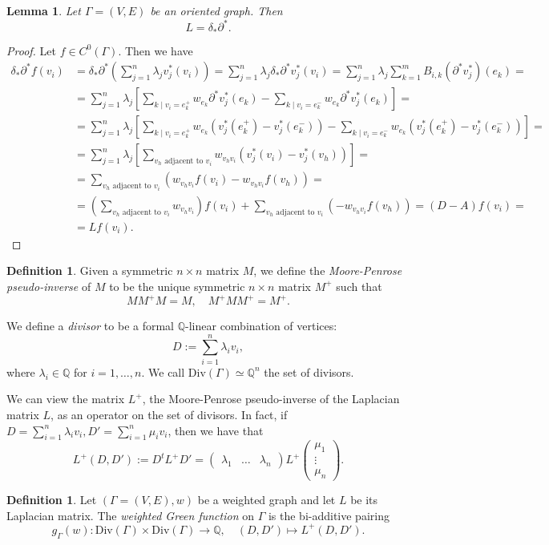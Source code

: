 \documentclass[a4paper,12 pt,titlepage,twoside]{book}
\newcommand{\numberset}{\mathbb}
\newcommand{\Q}{\numberset{Q}}
\theoremstyle{plain}
\theoremstyle{theorem}
\newtheorem{lemma}[thm]{Lemma}
\theoremstyle{definition}
\newtheorem{defn}[thm]{Definition}
\theoremstyle{remark}
\begin{document}
	\begin{lemma}
		Let $\Gamma=(V,E)$ be an oriented graph. Then $$L = \delta_* \partial^*.$$
	\end{lemma}
	\begin{proof}
		Let $f \in C^0(\Gamma).$ Then we have
		$$\begin{aligned}
		\delta_* \partial^* f(v_i) &= \delta_* \partial^*\left(\sum_{j=1}^n \lambda_j v_j^*(v_i)\right) = \sum_{j=1}^n \lambda_j \delta_* \partial^* v_j^* (v_i) = \sum_{j=1}^n \lambda_j \sum_{k=1}^m B_{i,k} (\partial^* v_j^*)(e_k)=\\&= \sum_{j=1}^n \lambda_j \left[\sum_{k \mid v_i=e_k^+} w_{e_k}\partial^* v_j^*(e_k) - \sum_{k \mid v_i=e_k^-} w_{e_k}\partial^* v_j^*(e_k) \right] =\\&= \sum_{j=1}^n \lambda_j \left[\sum_{k \mid v_i=e_k^+} w_{e_k}\left(v_j^* (e_k^+) - v_j^*(e_k^-)\right) - \sum_{k \mid v_i=e_k^-} w_{e_k}\left(v_j^*(e_k^+) - v_j^*(e_k^-)\right)\right] =\\&= \sum_{j=1}^n \lambda_j \left[\sum_{v_h \text{ adjacent to } v_i} w_{v_hv_i}(v_j^*(v_i) - v_j^*(v_h))\right] =\\&= \sum_{v_h \text{ adjacent to } v_i} \left(w_{v_hv_i}f(v_i) - w_{v_hv_i}f(v_h)\right) =\\&= \left(\sum_{v_h \text{ adjacent to } v_i} w_{v_hv_i}\right) f(v_i) + \sum_{v_h \text{ adjacent to } v_i} \left(-w_{v_hv_i}f(v_h)\right) = (D-A)f(v_i) =\\&= L f(v_i).
		\end{aligned}$$
	\end{proof}
	\begin{defn}
		Given a symmetric $n \times n$ matrix $M$, we define the \emph{Moore-Penrose pseudo-inverse} of $M$ to be the unique symmetric $n \times n$ matrix $M^+$ such that $$M M^+ M = M, \quad M^+ M M^+ = M^+.$$
	\end{defn}
	We define a \emph{divisor} to be a formal $\Q$-linear combination of vertices: $$D := \sum_{i=1}^n \lambda_i v_i,$$ where $\lambda_i \in \Q$ for $i = 1, \dots, n.$ We call $\text{Div}(\Gamma) \simeq \Q^n$ the set of divisors.
	
	We can view the matrix $L^+$, the Moore-Penrose pseudo-inverse of the Laplacian matrix $L$, as an operator on the set of divisors. In fact, if $D = \sum_{i=1}^n \lambda_i v_i, D'= \sum_{i=1}^n \mu_i v_i$, then we have that $$L^+(D, D') := D^tL^+ D' =\left(\begin{array}{ccc} \lambda_1 & \dots & \lambda_n \end{array}\right) L^+ \left(\begin{array}{c} \mu_1\\ \vdots \\ \mu_n \end{array}\right).$$
	\begin{defn}\label{def: weighted Green function}
		Let $(\Gamma=(V,E), w)$ be a weighted graph and let $L$ be its Laplacian matrix. The \emph{weighted Green function} on $\Gamma$ is the bi-additive pairing $$g_{\Gamma}(w) \colon \text{Div}(\Gamma) \times \text{Div}(\Gamma) \rightarrow \Q, \quad (D,D') \mapsto L^+(D,D').$$
	\end{defn}
	
\end{document}
